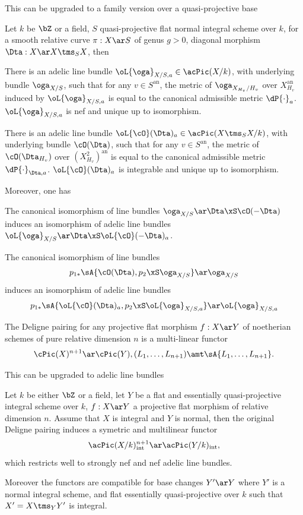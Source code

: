 \documentclass[a4paper, twoside]{article}
\begin{document}
This can be upgraded to a family version over a quasi-projective base
\begin{thm}[Theorem~2.3]
	Let $k$ be $\bZ$ or a field, $S$ quasi-projective flat normal integral scheme over $k$, for a smooth relative curve $\pi:X\ar S$ of genus $g>0$, diagonal morphism $\Dta:X\ar X\tms_{S}X$, then
	\begin{enr}
		\item There is an adelic line bundle $\oL{\oga}_{X/S,a}\in\acPic(X/k)$, with underlying bundle $\oga_{X/S}$, such that for any $v\in S^{\mathrm{an}}$, the metric of $\oga_{X_{H_{v}}/H_{v}}$ over $X_{H_{v}}^{\mathrm{an}}$ induced by $\oL{\oga}_{X/S,a}$ is equal to the canonical admissible metric $\dP{\cdot}_{a}$. $\oL{\oga}_{X/S,a}$ is nef and unique up to isomorphism.
		\item There is an adelic line bundle $\oL{\cO}(\Dta)_{a}\in\acPic(X\tms_{S}X/k)$, with underlying bundle $\cO(\Dta)$, such that for any $v\in S^{\mathrm{an}}$, the metric of $\cO(\Dta_{H_{v}})$ over $(X_{H_{v}}^{2})^{\mathrm{an}}$ is equal to the canonical admissible metric $\dP{\cdot}_{\Dta,a}$. $\oL{\cO}(\Dta)_{a}$ is integrable and unique up to isomorphism.
	\end{enr}
	Moreover, one has
	\begin{enr}
		\item The canonical isomorphism of line bundles $\oga_{X/S}\ar\Dta\xS\cO(-\Dta)$ induces an isomorphism of adelic line bundles $\oL{\oga}_{X/S}\ar\Dta\xS\oL{\cO}(-\Dta)_{a}$.
		\item The canonical isomorphism of line bundles
		\[
			p_{1*}\sA{\cO(\Dta),p_{2}\xS\oga_{X/S}}\ar\oga_{X/S}
		\]
		induces an isomorphism of adelic line bundles
		\[
			p_{1*}\sA{\oL{\cO}(\Dta)_{a},p_{2}\xS\oL{\oga}_{X/S,a}}\ar\oL{\oga}_{X/S,a}
		\]
	\end{enr}
\end{thm}

The Deligne pairing for any projective flat morphism $f:X\ar Y$ of noetherian schemes of pure relative dimension $n$ is a multi-linear functor
\[
	\cPic(X)^{n+1}\ar\cPic(Y), (L_{1},\ldots,L_{n+1})\amt\sA{L_{1},\ldots,L_{n+1}}.
\]


This can be upgraded to adelic line bundles
\begin{thm}[{\cite[Theorem~4.1.2]{YZ2021}}]
	Let $k$ be either $\bZ$ or a field, let $Y$ be a flat and essentially quasi-projective integral scheme over $k$, $f:X\ar Y$ a projective flat morphism of relative dimension $n$. Assume that $X$ is integral and $Y$ is normal, then the original Deligne pairing induces a symetric and multilinear functor
	\[
		\acPic(X/k)_{\mathrm{int}}^{n+1}\ar\acPic(Y/k)_{\mathrm{int}},
	\]
	which restricts well to strongly nef and nef adelic line bundles.

	Moreover the functors are compatible for base changes $Y'\ar Y$ where $Y'$ is a normal integral scheme, and flat essentially quasi-projective over $k$ such that $X'=X\tms_{Y}Y'$ is integral.
\end{thm}
\end{document}
